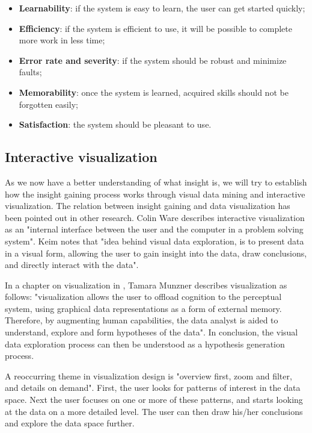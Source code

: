\begin{itemize}
	\item \textbf{Learnability}: if the system is easy to learn, the user can get started quickly;
	\item \textbf{Efficiency}: if the system is efficient to use, it will be possible to complete more work in less time;
	\item \textbf{Error rate and severity}: if the system should be robust and minimize faults;
	\item \textbf{Memorability}: once the system is learned, acquired skills should not be forgotten easily;
	\item \textbf{Satisfaction}: the system should be pleasant to use.
\end{itemize}


\subsection{Interactive visualization}\label{chapter:literature_study:section:user:subsection:interactive}

As we now have a better understanding of what insight is, we will try to establish how the insight gaining process works through visual data mining and interactive visualization. The relation between insight gaining and data visualization has been pointed out in other research. Colin Ware \cite{ware:2004} describes interactive visualization as an "internal interface between the user and the computer in a problem solving system". Keim \cite{keim:2002} notes that "idea behind visual data exploration, is to present data in a visual form, allowing the user to gain insight into the data, draw conclusions, and directly interact with the data".

In a chapter on visualization in \cite{shirley:2009}, Tamara Munzner describes visualization as follows: "visualization allows the user to offload cognition to the perceptual system, using graphical data representations as a form of external memory. Therefore, by augmenting human capabilities, the data analyst is aided to understand, explore and form hypotheses of the data"\cite{shirley:2009}. In conclusion, the visual data exploration process can then be understood as a hypothesis generation process\cite{keim:2002}.

A reoccurring theme in visualization design is "overview first, zoom and filter, and details on demand"\cite{keim:2002, shirley:2009, ware:2004}. First, the user looks for patterns of interest in the data space. Next the user focuses on one or more of these patterns, and starts looking at the data on a more detailed level. The user can then draw his/her conclusions and explore the data space further\cite{keim:2002}. 


